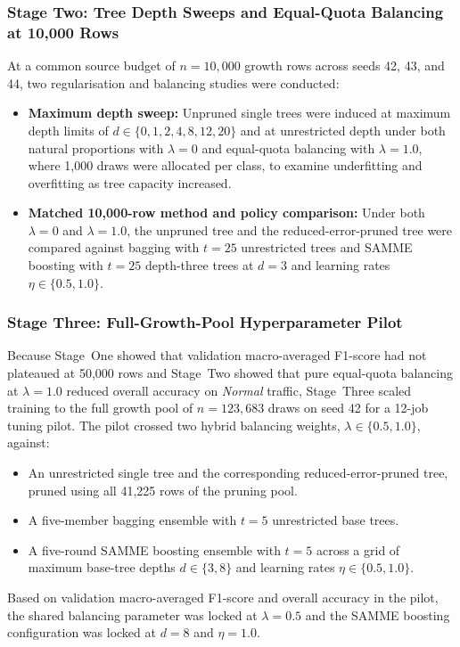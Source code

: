 \subsubsection{Stage Two: Tree Depth Sweeps and Equal-Quota Balancing at 10,000 Rows}
At a common source budget of $n = 10{,}000$ growth rows across seeds 42, 43, and 44, two regularisation and balancing studies were conducted:
\begin{itemize}
    \item \textbf{Maximum depth sweep:} Unpruned single trees were induced at maximum depth limits of $d \in \{0, 1, 2, 4, 8, 12, 20\}$ and at unrestricted depth under both natural proportions with $\lambda = 0$ and equal-quota balancing with $\lambda = 1.0$, where 1,000 draws were allocated per class, to examine underfitting and overfitting as tree capacity increased.
    \item \textbf{Matched 10,000-row method and policy comparison:} Under both $\lambda = 0$ and $\lambda = 1.0$, the unpruned tree and the reduced-error-pruned tree were compared against bagging with $t = 25$ unrestricted trees and SAMME boosting with $t = 25$ depth-three trees at $d = 3$ and learning rates $\eta \in \{0.5, 1.0\}$.
\end{itemize}

\subsubsection{Stage Three: Full-Growth-Pool Hyperparameter Pilot}
Because Stage~One showed that validation macro-averaged F1-score had not plateaued at 50,000 rows and Stage~Two showed that pure equal-quota balancing at $\lambda = 1.0$ reduced overall accuracy on \emph{Normal} traffic, Stage~Three scaled training to the full growth pool of $n = 123{,}683$ draws on seed 42 for a 12-job tuning pilot. The pilot crossed two hybrid balancing weights, $\lambda \in \{0.5, 1.0\}$, against:
\begin{itemize}
    \item An unrestricted single tree and the corresponding reduced-error-pruned tree, pruned using all 41,225 rows of the pruning pool.
    \item A five-member bagging ensemble with $t = 5$ unrestricted base trees.
    \item A five-round SAMME boosting ensemble with $t = 5$ across a grid of maximum base-tree depths $d \in \{3, 8\}$ and learning rates $\eta \in \{0.5, 1.0\}$.
\end{itemize}
Based on validation macro-averaged F1-score and overall accuracy in the pilot, the shared balancing parameter was locked at $\lambda = 0.5$ and the SAMME boosting configuration was locked at $d = 8$ and $\eta = 1.0$.

